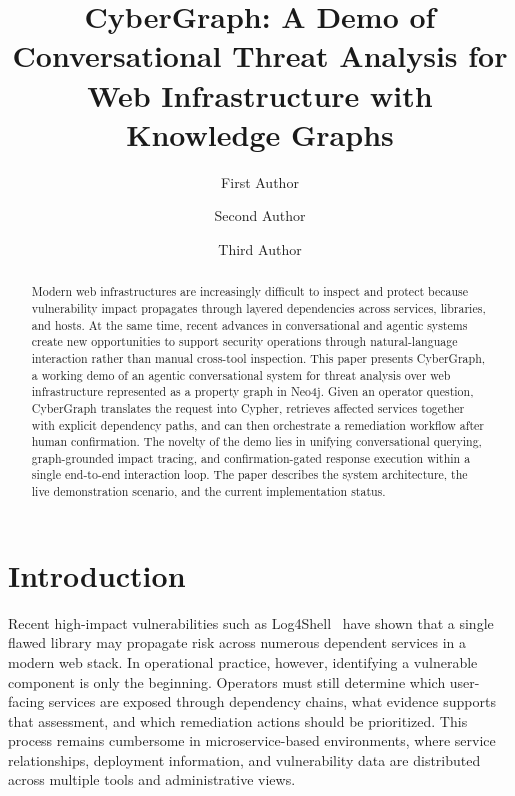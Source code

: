 \documentclass[runningheads]{llncs}
\newcommand{\sysname}{CyberGraph\xspace}
\begin{document}
\title{\sysname: A Demo of Conversational Threat Analysis for Web Infrastructure with Knowledge Graphs}
\titlerunning{\sysname: Conversational Threat Analysis Demo}

\author{First Author \and
Second Author \and
Third Author}


\maketitle

\begin{abstract}
Modern web infrastructures are increasingly difficult to inspect and protect because vulnerability impact propagates through layered dependencies across services, libraries, and hosts. At the same time, recent advances in conversational and agentic systems create new opportunities to support security operations through natural-language interaction rather than manual cross-tool inspection. This paper presents \sysname, a working demo of an agentic conversational system for threat analysis over web infrastructure represented as a property graph in Neo4j. Given an operator question, \sysname translates the request into Cypher, retrieves affected services together with explicit dependency paths, and can then orchestrate a remediation workflow after human confirmation. The novelty of the demo lies in unifying conversational querying, graph-grounded impact tracing, and confirmation-gated response execution within a single end-to-end interaction loop. The paper describes the system architecture, the live demonstration scenario, and the current implementation status.

\end{abstract}

\section{Introduction}
Recent high-impact vulnerabilities such as Log4Shell~\cite{cve2021log4shell} have shown that a single flawed library may propagate risk across numerous dependent services in a modern web stack. In operational practice, however, identifying a vulnerable component is only the beginning. Operators must still determine which user-facing services are exposed through dependency chains, what evidence supports that assessment, and which remediation actions should be prioritized. This process remains cumbersome in microservice-based environments, where service relationships, deployment information, and vulnerability data are distributed across multiple tools and administrative views.
\end{document}

